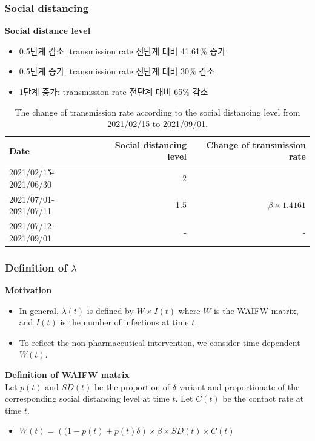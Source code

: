 \documentclass[aspectratio=169, 9pt, xcolor=dvipsnames]{beamer}
\begin{document}
	\begin{frame}\frametitle{Social distancing}
		\textbf{Social distance level}
		\begin{itemize}
			\item 0.5단계 감소: transmission rate 전단계 대비 41.61\% 증가
			\item 0.5단계 증가: transmission rate 전단계 대비 30\% 감소
			\item 1단계 증가: transmission rate 전단계 대비 65\% 감소
		\end{itemize}
	    \begin{table}
	    	\begin{tabular}{lrr}
	    		\toprule
	    		\textbf{Date} & \textbf{Social distancing level} & \textbf{Change of transmission rate} \\
	    		\midrule
	    		2021/02/15-2021/06/30 & 2 &  \\
	    		2021/07/01-2021/07/11 & 1.5 & $\beta \times 1.4161$ \\
	    		2021/07/12-2021/09/01\footnotemark[2] & - & - \\
	    		\bottomrule
	    	\end{tabular}
	    	\caption{The change of transmission rate according to the social distancing level from 2021/02/15 to 2021/09/01.}
	    \end{table}
	\end{frame}

	\begin{frame}\frametitle{Definition of $\lambda$}
		\textbf{Motivation}
	    \begin{itemize}
	    	\item In general, $\lambda(t)$ is defined by $W \times I(t)$ where $W$ is the WAIFW matrix, and $I(t)$ is the number of infectious at time $t$.
	    	\item To reflect the non-pharmaceutical intervention, we consider time-dependent $W(t)$.
	    \end{itemize}
	    \vspace{0.5cm}
	    \textbf{Definition of WAIFW matrix} \\
	    Let $p(t)$ and $SD(t)$ be the proportion of $\delta$ variant and proportionate of the corresponding social distancing level at time $t$. Let $C(t)$ be the contact rate at time $t$.
	    \begin{itemize}
	    	\item $W(t) = \left((1 - p(t) + p(t) \delta\right) \times \beta \times SD(t) \times C(t)$
	    \end{itemize}
	\end{frame}
\end{document}
